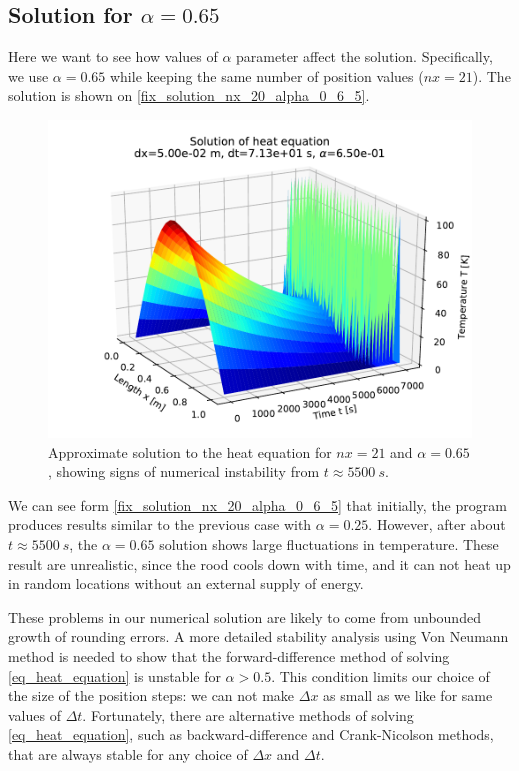\subsection{Solution for $\alpha=0.65$}

Here we want to see how values of $\alpha$ parameter affect the solution. Specifically, we use $\alpha = 0.65$ while keeping the same number of position values ($nx=21$). The solution is shown on \autoref{fix_solution_nx_20_alpha_0_6_5}.
\begin{figure}[H]
  \centering
  \includegraphics[width=1.0\textwidth]{figures/solution_6_50e_01.pdf}
  \caption{Approximate solution to the heat equation for $nx=21$ and $\alpha = 0.65$, showing signs of numerical instability from $t \approx 5500 \ s$.}
  \label{fix_solution_nx_20_alpha_0_6_5}
\end{figure}
We can see form \autoref{fix_solution_nx_20_alpha_0_6_5} that initially, the program produces results similar to the previous case with $\alpha=0.25$. However, after about $t \approx 5500 \ s$, the $\alpha=0.65$ solution shows large fluctuations in temperature. These result are unrealistic, since the rood cools down with time, and it can not heat up in random locations without an external supply of energy.

These problems in our numerical solution are likely to come from unbounded growth of rounding errors. A more detailed stability analysis using Von Neumann method is needed to show that the forward-difference method of solving \autoref{eq_heat_equation} is unstable for $\alpha > 0.5$. This condition limits our choice of the size of the position steps: we can not make $\Delta x$ as small as we like for same values of $\Delta t$. Fortunately, there are alternative methods of solving \autoref{eq_heat_equation}, such as backward-difference and Crank-Nicolson methods, that are always stable for any choice of $\Delta x$ and $\Delta t$.



